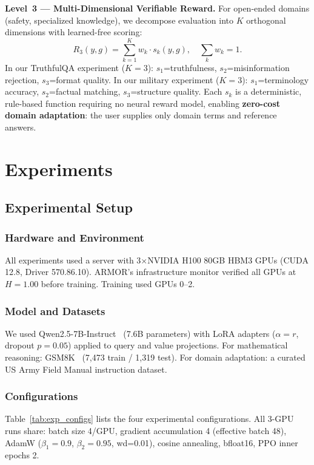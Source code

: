 \documentclass{ieeeaccess}
\begin{document}
\textbf{Level~3 --- Multi-Dimensional Verifiable Reward.}
For open-ended domains (safety, specialized knowledge), we decompose
evaluation into $K$ orthogonal dimensions with learned-free scoring:
\begin{equation}
R_3(y,g) = \sum_{k=1}^{K} w_k \cdot s_k(y,g), \quad \sum_k w_k = 1.
\label{eq:r3}
\end{equation}
In our TruthfulQA experiment ($K{=}3$): $s_1$=truthfulness,
$s_2$=misinformation rejection, $s_3$=format quality.
In our military experiment ($K{=}3$): $s_1$=terminology accuracy,
$s_2$=factual matching, $s_3$=structure quality.
Each $s_k$ is a deterministic, rule-based function requiring no neural
reward model, enabling \textbf{zero-cost domain adaptation}:
the user supplies only domain terms and reference answers.

\section{Experiments}
\label{sec:experiments}

\subsection{Experimental Setup}

\subsubsection{Hardware and Environment}
All experiments used a server with 3$\times$NVIDIA H100 80GB HBM3 GPUs
(CUDA 12.8, Driver 570.86.10). ARMOR's infrastructure monitor verified
all GPUs at $H=1.00$ before training. Training used GPUs 0--2.


\subsubsection{Model and Datasets}
We used Qwen2.5-7B-Instruct~\cite{yang2024qwen2} (7.6B parameters)
with LoRA adapters ($\alpha=r$, dropout $p=0.05$) applied to query and value projections.
For mathematical reasoning: GSM8K~\cite{cobbe2021gsm8k} (7,473 train / 1,319 test).
For domain adaptation: a curated US Army Field Manual instruction dataset.

\subsubsection{Configurations}
Table~\ref{tab:exp_configs} lists the four experimental configurations.
All 3-GPU runs share: batch size 4/GPU, gradient accumulation 4 (effective batch 48),
AdamW ($\beta_1=0.9$, $\beta_2=0.95$, wd=0.01), cosine annealing, bfloat16,
PPO inner epochs 2.
\end{document}
